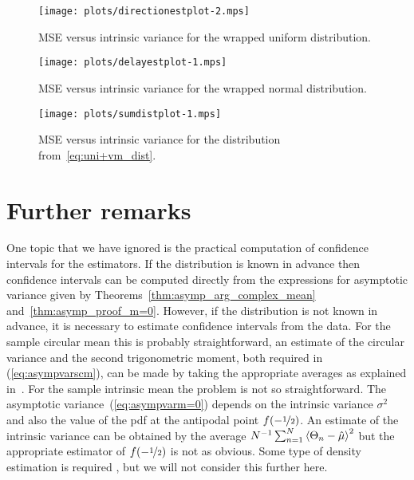\documentclass[journal]{IEEEtran}
\begin{document}
\begin{figure}[p]
	\centering
		\texttt{[image: plots/directionestplot-2.mps]}
		\caption{MSE versus intrinsic variance for the wrapped uniform distribution.}
		\label{fig:directionest_Uniform}
\end{figure}

\begin{figure}[p]
	\centering
		\texttt{[image: plots/delayestplot-1.mps]}
		\caption{MSE versus intrinsic variance for the wrapped normal distribution.}
		\label{fig:directionest_normal}
\end{figure}

\begin{figure}[p]
	\centering
		\texttt{[image: plots/sumdistplot-1.mps]}
		\caption{MSE versus intrinsic variance for the distribution from~\eqref{eq:uni+vm_dist}.}
		\label{fig:directionest_sumdist}
\end{figure}



\section{Further remarks}

One topic that we have ignored is the practical computation of confidence intervals for the estimators.  If the distribution is known in advance then confidence intervals can be computed directly from the expressions for asymptotic variance given by Theorems~\ref{thm:asymp_arg_complex_mean} and~\ref{thm:asymp_proof_m=0}.  However, if the distribution is not known in advance, it is necessary to estimate confidence intervals from the data.  For the sample circular mean this is probably straightforward, an estimate of the circular variance and the second trigonometric moment, both required in (\ref{eq:asympvarscm}), can be made by taking the appropriate averages as explained in~\cite{Fisher_common_mean_direction_dir_est_no_dist_assumptions1983}. For the sample intrinsic mean the problem is not so straightforward. The asymptotic variance~(\ref{eq:asympvarm=0}) depends on the intrinsic variance $\sigma^2$ and also the value of the pdf at the antipodal point $f(-\nicefrac{1}{2})$. An estimate of the intrinsic variance can be obtained by the average $N^{-1}\sum_{n=1}^{N}\left< \Theta_n - \hat{\mu} \right>^2$ but the appropriate estimator of $f(-\nicefrac{1}{2})$ is not as obvious. Some type of density estimation is required \cite{Fisher1989smoothingcircdata,Rosenblatt_dens_est_1956,Parzen_dens_est_1962}, but we will not consider this further here. 
\end{document}
